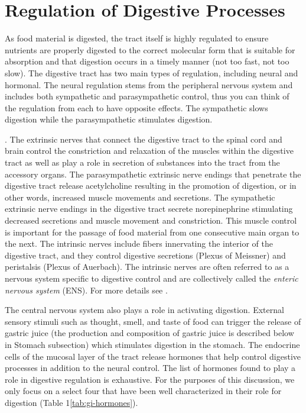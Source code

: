 \documentclass{tufte-handout}
\begin{document}
\section{Regulation of Digestive Processes}
As food material is digested, the tract itself is highly regulated to ensure nutrients are properly digested to the correct molecular form that is suitable for absorption and that digestion occurs in a timely manner (not too fast, not too slow). The digestive tract has two main types of regulation, including neural and hormonal. The neural regulation stems from the peripheral nervous system and includes both sympathetic and parasympathetic control, thus you can think of the regulation from each to have opposite effects. The sympathetic slows digestion while the parasympathetic stimulates digestion. 

. The extrinsic nerves that connect the digestive tract to the spinal cord and brain control the constriction and relaxation of the muscles within the digestive tract as well as play a role in secretion of substances into the tract from the accessory organs. The parasympathetic extrinsic nerve endings that penetrate the digestive tract release acetylcholine resulting in the promotion of digestion, or in other words, increased muscle movements and secretions. The sympathetic extrinsic nerve endings in the digestive tract secrete norepinephrine stimulating decreased secretions and muscle movement and constriction. This muscle control is important for the passage of food material from one consecutive main organ to the next. The intrinsic nerves include fibers innervating the interior of the digestive tract, and they control digestive secretions (Plexus of Meissner) and peristalsis (Plexus of Auerbach). The intrinsic nerves are often referred to as a nervous system specific to digestive control and are collectively called the \emph{enteric nervous system} (ENS).  For more details see \citet{Furness2012}.

The central nervous system also plays a role in activating digestion. External sensory stimuli such as thought, smell, and taste of food can trigger the release of gastric juice (the production and composition of gastric juice is described below in Stomach subsection) which stimulates digestion in the stomach. The endocrine cells of the mucosal layer of the tract release hormones that help control digestive processes in addition to the neural control. The  list of hormones found to play a role in digestive regulation is exhaustive. For the purposes of this discussion, we only focus on a select four that have been well characterized in their role for digestion (Table 1\ref{tab:gi-hormones}). 
\end{document}
